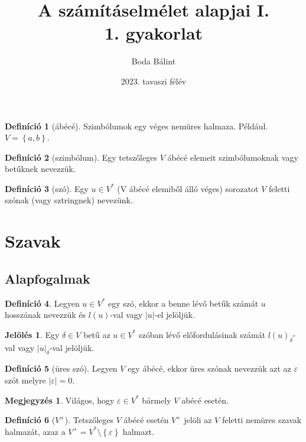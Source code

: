 \documentclass[a4paper,12pt]{article}
\title{\huge{A számításelmélet alapjai I.} \\[-4pt] \large 1. gyakorlat \vspace{-15pt}}
\author{Boda Bálint}
\date{\vspace{-12pt}2023. tavaszi félév}
\theoremstyle{definition}
\newtheorem*{definition*}{Definíció}
\newtheorem*{remark}{Megjegyzés}
\newtheorem*{notation*}{Jelölés}
\begin{document}
	\maketitle
	\vspace{-10pt}
	
	\begin{definition*}[ábécé]
		Szimbólumok egy véges nemüres halmaza. Például. $ V = \left\lbrace a,b \right\rbrace $.
	\end{definition*}
	
	\begin{definition*}[szimbólum]
		Egy tetszőleges $ V $ ábécé elemeit szimbólumoknak vagy betűknek nevezzük.
	\end{definition*}
	
	\begin{definition*}[szó]
		Egy $ u \in V^* $ (V ábécé elemiből álló véges) sorozatot $ V $ feletti szónak (vagy sztringnek) nevezünk.
	\end{definition*}
	
	\section{Szavak}
	\subsection{Alapfogalmak}
	
	\begin{definition*}
		Legyen $ u \in V^* $ egy szó, ekkor a benne lévő betűk számát $u$ hosszának nevezzük  és $ l(u) $-val vagy $\left| u \right| $-el jelöljük.
	\end{definition*}
	
	\begin{notation*}
		Egy $ \delta \in V $ betű az $ u \in V^* $ szóban lévő előfordulásinak számát $ l(u)_{\delta} $-val vagy $ \left| u \right|_{\delta} $-val jelöljük.
	\end{notation*}
	
	\begin{definition*}[üres szó]
		Legyen $V$ egy ábécé, ekkor üres szónak nevezzük azt az $ \varepsilon $ szót melyre $ \left| \varepsilon \right| = 0 $. 
	\end{definition*}
	
	\begin{remark}
		Világos, hogy $ \varepsilon \in V^* $  bármely $ V $ abécé esetén.
	\end{remark}
	
	\begin{definition*}[$ V^+ $]
		Tetszőleges $ V $ ábécé esetén $ V^+ $ jelöli az $ V $ feletti nemüres szavak halmazát, azaz a $ V^+ = V^* \setminus \left\lbrace \varepsilon \right\rbrace $ halmazt. 
	\end{definition*}
	
\end{document}
